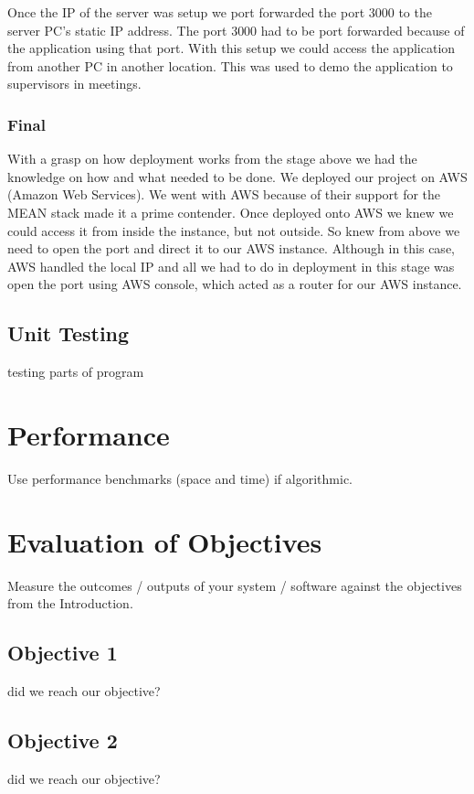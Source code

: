 Once the IP of the server was setup we port forwarded the port 3000 to the server PC's static IP address. The port 3000 had to be port forwarded because of the application using that port. With this setup we could access the application from another PC in another location. This was used to demo the application to supervisors in meetings.

\subsubsection{Final}
With a grasp on how deployment works from the stage above we had the knowledge on how and what needed to be done. We deployed our project on AWS (Amazon Web Services). We went with AWS because of their support for the MEAN stack made it a prime contender. Once deployed onto AWS we knew we could access it from inside the instance, but not outside. So knew from above we need to open the port and direct it to our AWS instance. Although in this case, AWS handled the local IP and all we had to do in deployment in this stage was open the port using AWS console, which acted as a router for our AWS instance.

\subsection{Unit Testing}
testing parts of program


\section{Performance}
Use performance benchmarks (space and time) if algorithmic.

\section{Evaluation of Objectives}
Measure the outcomes / outputs of your system / software against the objectives from the Introduction.
\subsection{Objective 1}
did we reach our objective?

\subsection{Objective 2}
did we reach our objective?


